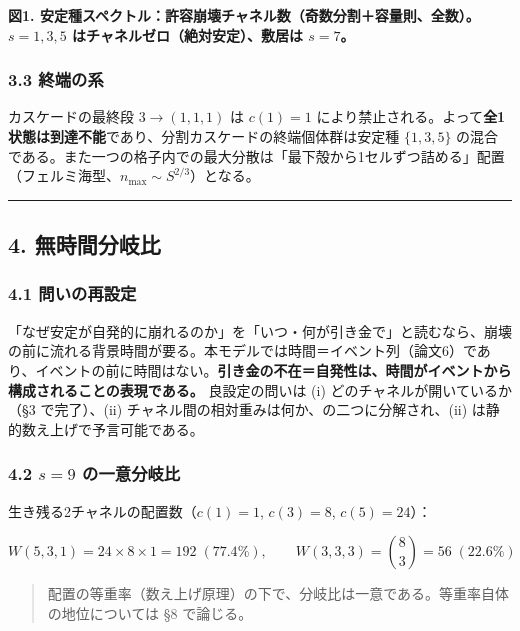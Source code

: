 \documentclass[
]{ltjsarticle}
\begin{document}
\textbf{図1.
安定種スペクトル：許容崩壊チャネル数（奇数分割＋容量則、全数）。\(s=1,3,5\)
はチャネルゼロ（絶対安定）、敷居は \(s=7\)。}

\subsubsection{3.3 終端の系}\label{ux7d42ux7aefux306eux7cfb}

カスケードの最終段 \(3\to(1,1,1)\) は \(c(1)=1\)
により禁止される。よって\textbf{全1状態は到達不能}であり、分割カスケードの終端個体群は安定種
\(\{1,3,5\}\)
の混合である。また一つの格子内での最大分散は「最下殻から1セルずつ詰める」配置（フェルミ海型、\(n_{\max}\sim S^{2/3}\)）となる。

\begin{center}\rule{0.5\linewidth}{0.5pt}\end{center}

\subsection{4. 無時間分岐比}\label{ux7121ux6642ux9593ux5206ux5c90ux6bd4}

\subsubsection{4.1
問いの再設定}\label{ux554fux3044ux306eux518dux8a2dux5b9a}

「なぜ安定が自発的に崩れるのか」を「いつ・何が引き金で」と読むなら、崩壊の前に流れる背景時間が要る。本モデルでは時間＝イベント列（論文6）であり、イベントの前に時間はない。\textbf{引き金の不在＝自発性は、時間がイベントから構成されることの表現である。}
良設定の問いは (i) どのチャネルが開いているか（§3 で完了）、(ii)
チャネル間の相対重みは何か、の二つに分解され、(ii)
は静的数え上げで予言可能である。

\subsubsection{\texorpdfstring{4.2 \(s=9\)
の一意分岐比}{4.2 s=9 の一意分岐比}}\label{s9-ux306eux4e00ux610fux5206ux5c90ux6bd4}

生き残る2チャネルの配置数（\(c(1)=1\), \(c(3)=8\), \(c(5)=24\)）：

\[
W(5,3,1)=24\times8\times1=192\;(77.4\%),\qquad
W(3,3,3)=\binom{8}{3}=56\;(22.6\%)
\]

\begin{quote}
配置の等重率（数え上げ原理）の下で、分岐比は一意である。等重率自体の地位については
§8 で論じる。
\end{quote}
\end{document}
